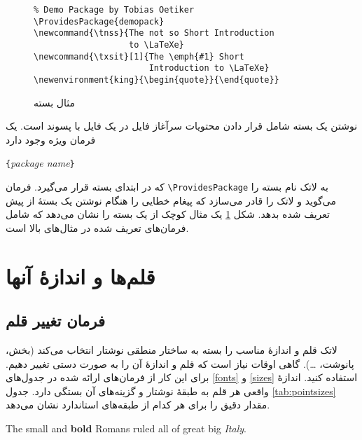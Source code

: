 \begin{figure}[!htbp]
\setLR
\begin{lined}{\textwidth}
\begin{verbatim}
% Demo Package by Tobias Oetiker
\ProvidesPackage{demopack}
\newcommand{\tnss}{The not so Short Introduction 
                   to \LaTeXe}
\newcommand{\txsit}[1]{The \emph{#1} Short 
                       Introduction to \LaTeXe}
\newenvironment{king}{\begin{quote}}{\end{quote}}
\end{verbatim}
\end{lined}
\setRL
\caption{مثال بسته} \label{package}
\end{figure}

نوشتن یک بسته شامل قرار دادن محتویات سرآغاز فایل در یک فایل با پسوند  است. یک فرمان ویژه وجود دارد

\begin{lscommand}
\verb|{|\emph{package name}\verb|}|
\end{lscommand}


\noindent که در ابتدای بسته قرار می‌گیرد. فرمان \verb|\ProvidesPackage| به لاتک نام بسته را می‌گوید و لاتک را قادر می‌سازد که پیغام خطایی را هنگام نوشتن یک بستهٔ از پیش تعریف شده بدهد. شکل 
\ref{package} 
یک مثال کوچک از یک بسته را نشان می‌دهد که شامل فرمان‌های تعریف شده در مثال‌های بالا است.
\section{قلم‌ها و اندازهٔ آنها}
\subsection{فرمان تغییر قلم}
لاتک قلم و اندازهٔ مناسب را بسته به ساختار منطقی نوشتار‌ انتخاب می‌کند 
(بخش، پانوشت،  \ldots).  گاهی اوقات نیاز است که قلم و اندازهٔ آن را به صورت دستی تغییر دهیم. برای این کار از فرمان‌های ارائه شده در جدول‌های  
\ref{fonts}
 و 
\ref{sizes}
استفاده کنید. اندازهٔ واقعی هر قلم به طبقهٔ نوشتار و گزینه‌های آن بستگی دارد. جدول  
\ref{tab:pointsizes}
مقدار دقیق را برای هر کدام از طبقه‌های استاندارد نشان می‌دهد.


\begin{example}
{\small The small and 
\textbf{bold} Romans ruled}
{\Large all of great big 
\textit{Italy}.}
\end{example}


